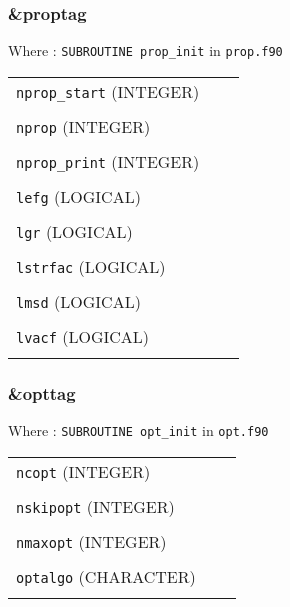 \documentclass[10pt,a4paper]{article}
\begin{document}
\subsubsection{\&proptag}

Where : \verb?SUBROUTINE prop_init? in \verb?prop.f90?

\begin{tabular}{lcc}
\\
\verb?nprop_start? (INTEGER)  & \\
\\
\verb?nprop?       (INTEGER)  & \\
\\
\verb?nprop_print? (INTEGER)  & \\
\\
\verb?lefg?        (LOGICAL)  & \\
\\
\verb?lgr?         (LOGICAL)  & \\
\\
\verb?lstrfac?     (LOGICAL)  & \\
\\
\verb?lmsd?        (LOGICAL)  & \\
\\
\verb?lvacf?       (LOGICAL)  & \\
\\
\end{tabular}

\subsubsection{\&opttag}

Where : \verb?SUBROUTINE opt_init? in \verb?opt.f90?

\begin{tabular}{lcc}
\\
\verb?ncopt?     (INTEGER) & \\

\\
\verb?nskipopt?  (INTEGER) & \\

\\
\verb?nmaxopt?   (INTEGER) & \\

\\
\verb?optalgo?   (CHARACTER) & \\
\\
\end{tabular}
\end{document}
